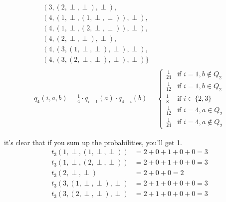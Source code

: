 \documentclass{article}
\begin{document}
\begin{tasks}
{\begin{itemize}
{\begin{gather*}
\begin{aligned}
                                & (3, (2, \perp, \perp), \perp), \\
                                & (4, (1, \perp, (1, \perp, \perp)), \perp), \\
                                & (4, (1, \perp, (2, \perp, \perp)), \perp), \\
                                & (4, (2, \perp, \perp), \perp), \\
                                & (4, (3, (1, \perp, \perp), \perp), \perp), \\
                                & (4, (3, (2, \perp, \perp), \perp), \perp)
                            \}
                        \end{aligned}\\
                        q_4(i, a, b) 
                        = \frac{1}{4}\cdot q_{i-1}(a)\cdot q_{4-i}(b)
                        = \begin{cases}
                            \frac{1}{24} & \text{if } i = 1, b \not\in Q_2 \\
                            \frac{1}{12} & \text{if } i = 1, b \in Q_2 \\
                            \frac{1}{8} & \text{if } i \in \{2, 3\} \\
                            \frac{1}{12} & \text{if } i = 4, a \in Q_2 \\
                            \frac{1}{24} & \text{if } i = 4, a \not\in Q_2
                        \end{cases}
                    \end{gather*}
                }
            \end{itemize}
            it's clear that if you sum up the probabilities, you'll get 1.
            \begin{displaymath}
                \begin{aligned}
                    t_3(1, \perp, (1, \perp, \perp)) &= 2 + 0 + 1 + 0 + 0 = 3 \\
                    t_3(1, \perp, (2, \perp, \perp)) &= 2 + 0 + 1 + 0 + 0 = 3 \\
                    t_3(2, \perp, \perp) &= 2 + 0 + 0 = 2 \\
                    t_3(3, (1, \perp, \perp), \perp) &= 2 + 1 + 0 + 0 + 0 = 3 \\
                    t_3(3, (2, \perp, \perp), \perp) &= 2 + 1 + 0 + 0 + 0 = 3
                \end{aligned}
            \end{displaymath}
}
\end{tasks}
\end{document}

